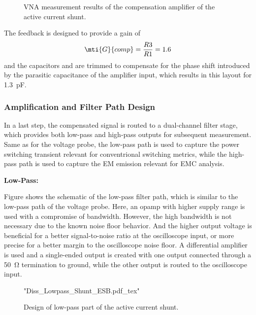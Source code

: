 \begin{figure}[ht]
	\centering
	
	\caption{VNA measurement results of the compensation amplifier of the active current shunt.}\label{fig:VNA_AShunt_comp_S}
\end{figure}

The feedback is designed to provide a gain of
\begin{equation}
	\mti{G}{comp} = \frac{R3}{R1} = 1.6
\end{equation}
and the capacitors  and  are trimmed to compensate for the phase shift introduced by the parasitic capacitance of the amplifier input, which results in this layout for \SI{1.3}{pF}.


\subsubsection*{Amplification and Filter Path Design}
In a last step, the compensated signal is routed to a dual-channel filter stage, which provides both low-pass and high-pass outputs for subsequent measurement.
Same as for the voltage probe, the low-pass path is used to capture the power switching transient relevant for conventrional switching metrics, while the high-pass path is used to capture the EM emission relevant for EMC analysis.

\textbf{Low-Pass:}

Figure  shows the schematic of the low-pass filter path, which is similar to the low-pass path of the voltage probe.
Here, an opamp with higher supply range is used with a compromise of bandwidth.
However, the high bandwidth is not necessary due to the known noise floor behavior.
And the higher output voltage is beneficial for a better signal-to-noise ratio at the oscilloscope input, or more precise for a better margin to the oscilloscope noise floor.
A differential amplifier is used and a single-ended output is created with one output connected through a \SI{50}{\ohm} termination to ground, while the other output is routed to the oscilloscope input.

\begin{figure}[ht]
	\centering
	{"Diss_Lowpass_Shunt_ESB.pdf_tex"}
	\caption{Design of low-pass part of the active current shunt.}\label{fig:ESBLowpass}
\end{figure}

